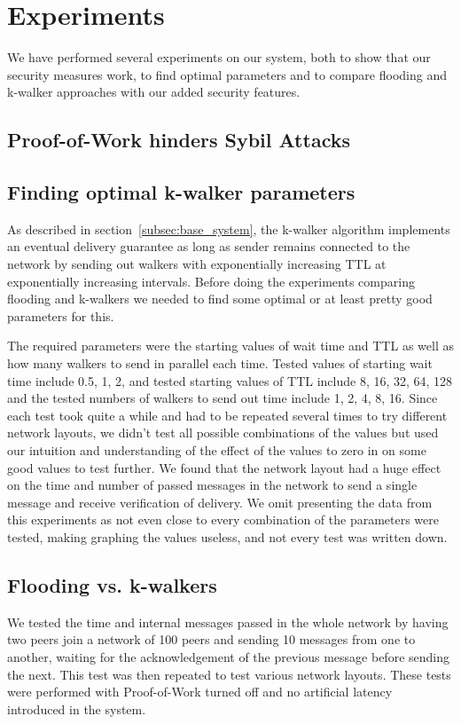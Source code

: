 \section{Experiments}
We have performed several experiments on our system, both to show that our security measures work, to find optimal parameters and to compare flooding and k-walker approaches with our added security features.

\subsection{Proof-of-Work hinders Sybil Attacks}

\subsection{Finding optimal k-walker parameters}
As described in section~\ref{subsec:base_system}, the k-walker algorithm implements an eventual delivery guarantee as long as sender remains connected to the network by sending out walkers with exponentially increasing TTL at exponentially increasing intervals. Before doing the experiments comparing flooding and k-walkers we needed to find some optimal or at least pretty good parameters for this.

The required parameters were the starting values of wait time and TTL as well as how many walkers to send in parallel each time. Tested values of starting wait time include 0.5, 1, 2, and tested starting values of TTL include 8, 16, 32, 64, 128 and the tested numbers of walkers to send out time include 1, 2, 4, 8, 16. Since each test took quite a while and had to be repeated several times to try different network layouts, we didn't test all possible combinations of the values but used our intuition and understanding of the effect of the values to zero in on some good values to test further. We found that the network layout had a huge effect on the time and number of passed messages in the network to send a single message and receive verification of delivery. We omit presenting the data from this experiments as not even close to every combination of the parameters were tested, making graphing the values useless, and not every test was written down.


\subsection{Flooding vs. k-walkers}
We tested the time and internal messages passed in the whole network by having two peers join a network of 100 peers and sending 10 messages from one to another, waiting for the acknowledgement of the previous message before sending the next. This test was then repeated to test various network layouts. These tests were performed with Proof-of-Work turned off and no artificial latency introduced in the system.

